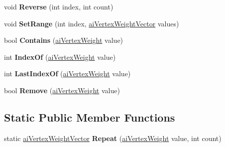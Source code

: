 \begin{DoxyCompactItemize}
\item 
\hypertarget{classai_vertex_weight_vector_a6ef4fccee0c011e21c0b647970ee2beb}{void {\bfseries Reverse} (int index, int count)}\label{classai_vertex_weight_vector_a6ef4fccee0c011e21c0b647970ee2beb}

\item 
\hypertarget{classai_vertex_weight_vector_a6f2facdb1fdea5b776bcf102e2fb1b1e}{void {\bfseries Set\+Range} (int index, \hyperlink{classai_vertex_weight_vector}{ai\+Vertex\+Weight\+Vector} values)}\label{classai_vertex_weight_vector_a6f2facdb1fdea5b776bcf102e2fb1b1e}

\item 
\hypertarget{classai_vertex_weight_vector_a32cee3e10ffb0fc4263f9fbc5bbea9c4}{bool {\bfseries Contains} (\hyperlink{structai_vertex_weight}{ai\+Vertex\+Weight} value)}\label{classai_vertex_weight_vector_a32cee3e10ffb0fc4263f9fbc5bbea9c4}

\item 
\hypertarget{classai_vertex_weight_vector_a8e2900da4c1c3664085b806cdd426d97}{int {\bfseries Index\+Of} (\hyperlink{structai_vertex_weight}{ai\+Vertex\+Weight} value)}\label{classai_vertex_weight_vector_a8e2900da4c1c3664085b806cdd426d97}

\item 
\hypertarget{classai_vertex_weight_vector_aa33f04c920f6da122f713d7f3b7a1bc7}{int {\bfseries Last\+Index\+Of} (\hyperlink{structai_vertex_weight}{ai\+Vertex\+Weight} value)}\label{classai_vertex_weight_vector_aa33f04c920f6da122f713d7f3b7a1bc7}

\item 
\hypertarget{classai_vertex_weight_vector_aeb496342bcba7a30da2b112ad67d850d}{bool {\bfseries Remove} (\hyperlink{structai_vertex_weight}{ai\+Vertex\+Weight} value)}\label{classai_vertex_weight_vector_aeb496342bcba7a30da2b112ad67d850d}

\end{DoxyCompactItemize}
\subsection*{Static Public Member Functions}
\begin{DoxyCompactItemize}
\item 
\hypertarget{classai_vertex_weight_vector_a1e333fd598cf29f6177d135f1f0e7fe9}{static \hyperlink{classai_vertex_weight_vector}{ai\+Vertex\+Weight\+Vector} {\bfseries Repeat} (\hyperlink{structai_vertex_weight}{ai\+Vertex\+Weight} value, int count)}\label{classai_vertex_weight_vector_a1e333fd598cf29f6177d135f1f0e7fe9}

\end{DoxyCompactItemize}
